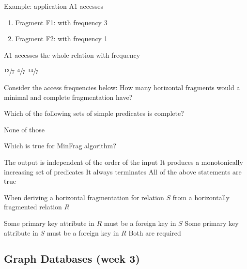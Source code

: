 \documentclass[12pt,a4paper]{exam} %
\begin{document}
\begin{questions}
\question Example: application A1 accesses
\begin{enumerate}
\item Fragment F1: with frequency 3
\item Fragment F2: with frequency 1
\end{enumerate}
A1 accesses the whole relation with frequency
\begin{checkboxes}
\CorrectChoice $\sfrac{13}{7}$
\choice $\sfrac{4}{7}$
\choice $\sfrac{14}{7}$
\end{checkboxes}

\question Consider the access frequencies below:
How many horizontal fragments would a minimal and complete fragmentation have?
\begin{checkboxes}
\end{checkboxes}

\question Which of the following sets of simple predicates is complete?
\begin{checkboxes}
\CorrectChoice None of those
\end{checkboxes}

\question Which is true for MinFrag algorithm?
\begin{checkboxes}
\choice The output is independent of the order of the input
\choice It produces a monotonically increasing set of predicates
\CorrectChoice It always terminates
\choice All of the above statements are true
\end{checkboxes}


\question When deriving a horizontal fragmentation for relation $S$ from a horizontally fragmented relation $R$
\begin{checkboxes}
\CorrectChoice Some primary key attribute in $R$ must be a foreign key in $S$
\choice Some primary key attribute in $S$ must be a foreign key in $R$
\choice Both are required
\end{checkboxes}

\end{questions}

\subsection{Graph Databases (week 3)} %
\end{document}
